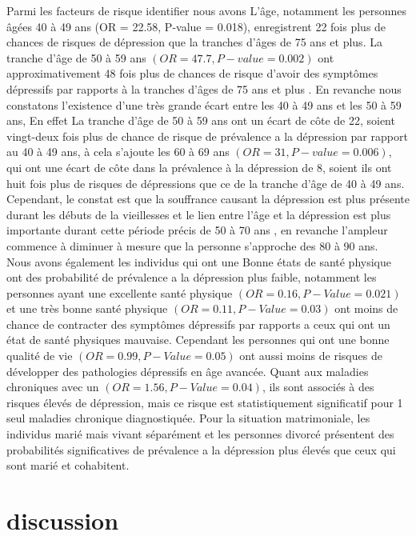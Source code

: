 \documentclass[a4paper]{article}
\begin{document}
Parmi les facteurs de risque identifier nous avons L’âge, notamment les personnes âgées 40 à 49 ans (OR = 22.58, P-value = 0.018), enregistrent 22 fois plus de chances de risques de dépression que la tranches d’âges de 75 ans et plus. La tranche d’âge de 50 à 59 ans $(OR =  47.7, P-value = 0.002)$ ont approximativement 48 fois plus de chances de risque d’avoir des symptômes dépressifs par rapports à la tranches d’âges de 75 ans et  plus  . En revanche nous constatons l’existence d’une très grande écart entre les 40 à 49 ans et les 50 à 59 ans, En effet La tranche d’âge de 50 à 59 ans ont un écart de côte de 22, soient vingt-deux fois plus de chance de risque de prévalence a la dépression par rapport au 40 à 49 ans, à cela s’ajoute les 60 à 69 ans $(OR = 31, P-value = 0.006)$, qui ont une écart de côte dans la prévalence à la dépression de 8, soient ils ont huit fois plus de risques de dépressions que ce de la tranche d’âge de 40 à 49 ans.\\
Cependant, le constat est que la souffrance causant la dépression est plus présente durant les débuts de la vieillesses et le lien entre l’âge et la dépression est plus importante durant cette période précis de 50 à 70 ans , en revanche l’ampleur commence à diminuer à mesure que la personne s’approche des 80 à 90 ans.\\
Nous avons également les individus qui ont une Bonne états de santé physique ont des probabilité de prévalence  a la dépression plus faible, notamment les personnes ayant une excellente santé physique $( OR = 0.16 , P-Value = 0.021)$ et une très bonne santé physique $(OR = 0.11, P-Value = 0.03)$ ont moins de chance de contracter des symptômes dépressifs par rapports a ceux qui ont un état de santé physiques mauvaise. Cependant les personnes qui ont une bonne qualité de vie $(OR = 0.99 , P-Value = 0.05)$ ont aussi moins de risques de développer des pathologies dépressifs en âge avancée. Quant aux maladies chroniques avec un $(OR = 1.56, P-Value = 0.04)$, ils sont associés à des risques élevés de dépression, mais ce risque est statistiquement significatif pour 1 seul maladies chronique diagnostiquée. Pour la situation matrimoniale, les individus marié mais vivant séparément et les personnes divorcé présentent des probabilités significatives de prévalence a la dépression plus élevés que ceux qui sont marié et cohabitent. 

\section{discussion}
\end{document}
